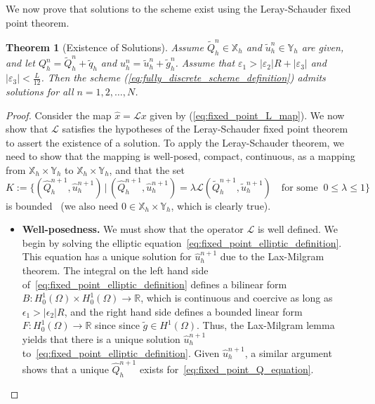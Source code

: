 \documentclass[10pt,letterpaper]{amsart}
\newcommand{\R}{\mathbb{R}}
\newtheorem{theorem}[lemma]{Theorem}
\theoremstyle{definition}{\newtheorem{definition}[lemma]{Definition}}
\theoremstyle{note}{\newtheorem{claim}{Claim}[section]
\newtheorem*{claim*}{Claim}}
\numberwithin{equation}{section}
\begin{document}
We now prove that solutions to the scheme exist using the Leray-Schauder fixed point theorem.
\begin{theorem}[Existence of Solutions]
\label{thm:existence_of_solutions}
Assume $\tilde Q_h^n \in \mathbb{X}_h$ and $\tilde u_h^n \in \mathbb{Y}_h$ are given, and let $Q_h^n = \tilde Q_h^n + \tilde q_h$ and $u_h^n = \tilde u_h^n + \tilde g_h^n$. Assume that $\varepsilon_1 > |\varepsilon_2|R + |\varepsilon_3|$ and $\lvert\varepsilon_3\rvert < \frac{L}{12}$. Then the scheme (\ref{eq:fully_discrete_scheme_definition}) admits solutions for all $n=1,2,\dots,N$. 
\end{theorem}
\begin{proof}
Consider the map $\hat x = \mathcal{L}x$ given by (\ref{eq:fixed_point_L_map}). We now show that $\mathcal{L}$ satisfies the hypotheses of the Leray-Schauder fixed point theorem to assert the existence of a solution.
To apply the Leray-Schauder theorem, we need to show that the mapping is well-posed, compact, continuous,  as a mapping from $\mathbb{X}_h\times \mathbb{Y}_h$ to $\mathbb{X}_h\times \mathbb{Y}_h$, and that the set
\begin{equation*}
	K:=\{(\widehat{Q}_h^{n+1},\widehat{u}_h^{n+1})\, |\, (\widehat{Q}_h^{n+1},\widehat{u}_h^{n+1})= \lambda \mathcal{L}(\tilde{Q}_h^{n+1},\tilde{u}_h^{n+1})\quad \text{for some }\ 0\leq \lambda \leq 1\}
\end{equation*}
is bounded~\cite[page 540]{Evans2010} (we also need $0\in \mathbb{X}_h\times \mathbb{Y}_h$, which is clearly true).

\begin{itemize}
    \item[--] \textbf{Well-posedness.} We must show that the operator $\mathcal{L}$ is well defined. We begin by solving the elliptic equation~\eqref{eq:fixed_point_elliptic_definition}. This equation has a unique solution for $\widehat{u}_h^{n+1}$ due to the Lax-Milgram theorem.
    The integral on the left hand side of~\eqref{eq:fixed_point_elliptic_definition} defines a bilinear form $B : H_0^1(\Omega)\times H_0^1(\Omega)\to \R$, which is continuous and coercive as long as $\epsilon_1> |\epsilon_2| R$, and the right hand side defines a bounded linear form $F:H_0^1(\Omega)\to\R$ since since $\tilde g \in H^1(\Omega)$. 
    Thus, the Lax-Milgram lemma yields that there is a unique solution $\widehat{u}_h^{n+1}$ to~\eqref{eq:fixed_point_elliptic_definition}. Given $\widehat{u}_h^{n+1}$, a similar argument shows that a unique $\widehat{Q}^{n+1}_h$ exists for~\eqref{eq:fixed_point_Q_equation}.
    

\end{itemize}
\end{proof}
\end{document}
